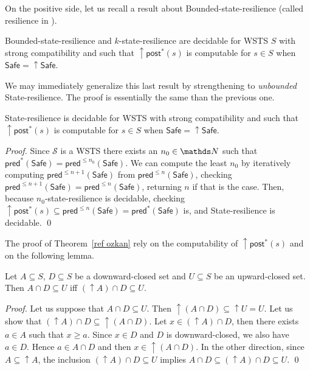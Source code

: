 \documentclass[runningheads]{llncs}
\newcommand{\pred}{\textsf{pred}}
\newcommand{\post}{\textsf{post}}
\newcommand{\Safe}{\textsf{Safe}}
\begin{document}
On the positive side, let us recall a result about {\sc Bounded-state-resilience} (called resilience in \cite{DBLP:conf/gg/Ozkan22,DBLP:journals/corr/abs-2108-00889}).
\begin{theorem}\cite{DBLP:conf/gg/Ozkan22,DBLP:journals/corr/abs-2108-00889}\label{ref ozkan}
{\sc Bounded-state-resilience} and {\sc $k$-state-resilience} are decidable for WSTS $S$ with strong compatibility and such that $\uparrow \post^*(s)$ is computable for $s \in S$
when
$\Safe=\uparrow \Safe$.
\end{theorem}

We may immediately generalize this last result by strengthening to \emph{unbounded} {\sc State-resilience}. The proof is essentially the same than the previous one.

\begin{corollary}\label{postcomputable}
{\sc State-resilience} is decidable for WSTS with strong compatibility and such that $\uparrow \post^*(s)$ is computable for $s \in S$
when
$\Safe=\uparrow \Safe$.
\end{corollary}

\begin{proof}
Since $\mathscr{S}$ is a WSTS there exists an $n_0 \in \N$ such that
$\pred^*(\Safe) =  \pred^{\leq n_0}(\Safe)$. We can compute the least $n_0$ by iteratively computing 
$\pred^{\leq n+1}(\Safe)$ from $\pred^{\leq n}(\Safe)$, checking 
$\pred^{\leq n+1}(\Safe) = \pred^{\leq n}(\Safe)$, 
returning $n$ if that is the case.
Then, because {\sc $n_0$-state-resilience} is decidable, 
checking $\uparrow \post^*(s) 
 \subseteq \pred^{\leq n}(\Safe) = \pred^*(\Safe)$ is,
and {\sc State-resilience} is decidable. \qed
\end{proof}

The proof of Theorem~\ref{ref ozkan} rely on the computability of $\uparrow \post^*(s)$ and on the following lemma.

\begin{lemma}\label{Lemma intersection}
Let $A \subseteq S$, $D \subseteq S$ be a downward-closed set and $U \subseteq S$ be an upward-closed set. 
Then $A \cap D \subseteq U$  iff $ (\uparrow  A) \cap D \subseteq U$.
\end{lemma}


\begin{proof}
Let us suppose that $A \cap D \subseteq U$. Then ${\uparrow (A \cap D)} \subseteq {\uparrow U} = U$.
Let us show that $({\uparrow A}) \cap D \subseteq {\uparrow (A \cap D)}$.
Let $x \in ({\uparrow A}) \cap D$, then there exists $a \in A$ such that $x \geq a$.
Since $x \in D$ and $D$ is downward-closed, we also have $a \in D$.
Hence $a \in A \cap D$ and then $x \in { \uparrow (A \cap D)}$.
In the other direction,
since $A \subseteq {\uparrow A}$, the inclusion
$({\uparrow  A}) \cap D \subseteq U$ implies
$A \cap D \subseteq ({\uparrow  A}) \cap D \subseteq U$. \qed
\end{proof}
\end{document}
